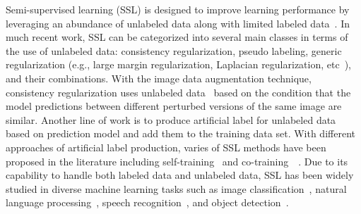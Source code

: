 \documentclass{article}
\begin{document}
Semi-supervised learning (SSL) is designed to improve learning performance by leveraging an abundance of unlabeled data along with limited labeled data~\citep{chapelle2006semi}. In much recent work, SSL can be categorized into several main classes in terms of the use of unlabeled data: consistency regularization, pseudo labeling, generic regularization (e.g., large margin regularization, Laplacian regularization, etc~\citep{chapelle2006semi}), and their combinations. With the image data augmentation technique, consistency regularization uses unlabeled data~\citep{baird1992document,schmidhuber2015deep} based on the condition that the model predictions between different perturbed versions of the same image are similar. Another line of work is to produce artificial label for unlabeled data based on prediction model and add them to 
the training data set. With different approaches of artificial label production, varies of SSL methods have been proposed in the literature including self-training~\citep{yarowsky1995unsupervised, lee2013pseudo,rosenberg2005semi, sajjadi2016regularization, laine2017temporal, xie2020self} and co-training~~\citep{blum1998combining, zhou2005tri, sindhwani2008rkhs, wang2008random, yu2008bayesian, wang2010new,  chen2011automatic}. Due to its capability to handle both labeled data and unlabeled data, SSL has been widely studied in diverse machine learning tasks such as image classification~\citep{sajjadi2016regularization,laine2017temporal, tarvainen2017mean, xie2020unsupervised, berthelot2019mixmatch, berthelot2019remixmatch}, natural language processing~\citep{turian2010word}, speech recognition~\citep{yu2010active}, and object detection~\citep{misra2015watch}. 
\end{document}
